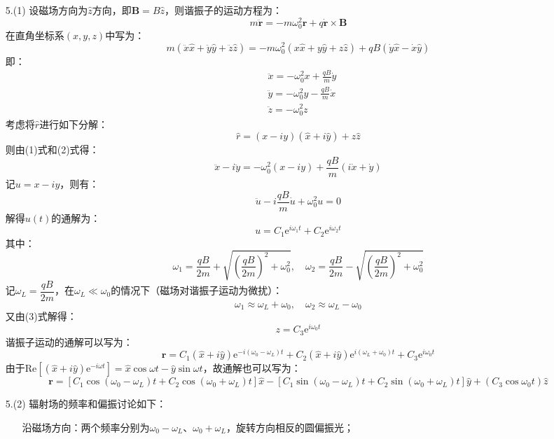 \documentclass[a4paper,fontset=none]{ctexart}
\begin{document}
\begin{itemize}
    \item[5.(1)]
    设磁场方向为$\hat{z}$方向，即$\bm{B}=B\hat{z}$，则谐振子的运动方程为：
    \[
        m\ddot{\bm{r}} = -m\omega_0^2\bm{r} + q\dot{\bm{r}} \times \bm{B}
    \]
    在直角坐标系$(x,y,z)$中写为：
    \[
        m(\ddot{x}\hat{x} + \ddot{y}\hat{y} + \ddot{z}\hat{z}) = -m\omega_0^2(x\hat{x} + y\hat{y} + z\hat{z}) + qB(\dot{y}\hat{x} - \dot{x}\hat{y})
    \]
    即：
    \begin{align}
        &\ddot{x} = -\omega_0^2x + \frac{qB}{m}\dot{y} \\
        &\ddot{y} = -\omega_0^2y - \frac{qB}{m}\dot{x} \\
        &\ddot{z} = -\omega_0^2z
    \end{align}
    考虑将$\hat{r}$进行如下分解：
    \[
        \hat{r} = (x-iy)(\hat{x}+i\hat{y}) + z\hat{z}
    \]
    则由(1)式和(2)式得：
    \[
        \ddot{x} - i\ddot{y} = -\omega_0^2(x-iy) + \frac{qB}{m}(i\dot{x}+\dot{y})
    \]
    记$u=x-iy$，则有：
    \[
        \ddot{u} - i\frac{qB}{m}\dot{u} + \omega_0^2u = 0
    \]
    解得$u(t)$的通解为：
    \[
        u = C_1\mathrm{e}^{i\omega_1t} + C_2\mathrm{e}^{i\omega_2t}
    \]
    其中：
    \[
        \omega_1 = \frac{qB}{2m} + \sqrt{\left(\frac{qB}{2m}\right)^2 + \omega_0^2},\quad
        \omega_2 = \frac{qB}{2m} - \sqrt{\left(\frac{qB}{2m}\right)^2 + \omega_0^2}
    \]
    记$\omega_L=\dfrac{qB}{2m}$，在$\omega_L\ll\omega_0$的情况下（磁场对谐振子运动为微扰）：
    \[
        \omega_1 \approx \omega_L + \omega_0,\quad \omega_2 \approx \omega_L - \omega_0
    \]
    又由(3)式解得：
    \[
        z = C_3\mathrm{e}^{i\omega_0t}
    \]
    谐振子运动的通解可以写为：
    \[
        \bm{r} = C_1(\hat{x}+i\hat{y})\mathrm{e}^{-i(\omega_0-\omega_L)t} + C_2(\hat{x}+i\hat{y})\mathrm{e}^{i(\omega_L+\omega_0)t} + C_3\mathrm{e}^{i\omega_0t}
    \]
    由于$\mathrm{Re}\left[(\hat{x} + i\hat{y})\mathrm{e}^{-i\omega t}\right]=\hat{x}\cos\omega t - \hat{y}\sin\omega t$，故通解也可以写为：
    \[
        \bm{r} = \left[C_1\cos(\omega_0-\omega_L)t + C_2\cos(\omega_0+\omega_L)t\right]\hat{x} - \left[C_1\sin(\omega_0-\omega_L)t + C_2\sin(\omega_0+\omega_L)t\right]\hat{y} + (C_3\cos\omega_0t)\hat{z}
    \]

    \item[5.(2)]
    辐射场的频率和偏振讨论如下：
    \begin{itemize}
        \item[\bullet] 沿磁场方向：两个频率分别为$\omega_0-\omega_L$、$\omega_0+\omega_L$，旋转方向相反的圆偏振光；


\end{itemize}
\end{itemize}
\end{document}
